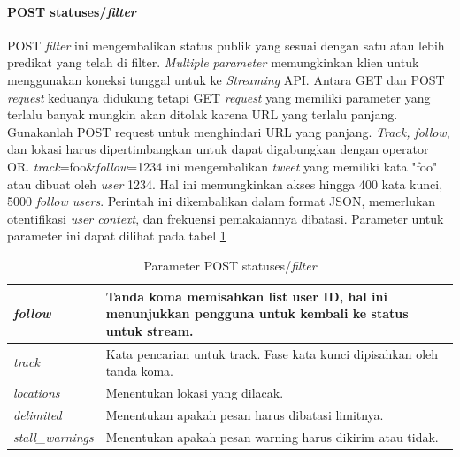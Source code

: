 \paragraph{POST statuses/\textit{filter}}
POST \textit{filter} ini mengembalikan status publik yang sesuai dengan satu atau lebih predikat yang telah di filter. \textit{Multiple parameter} memungkinkan klien untuk menggunakan koneksi tunggal untuk ke \textit{Streaming} API. Antara GET dan POST \textit{request} keduanya didukung tetapi GET \textit{request} yang memiliki parameter yang terlalu banyak mungkin akan ditolak karena URL yang terlalu panjang. Gunakanlah POST request untuk menghindari URL yang panjang.
\textit{Track, follow}, dan lokasi harus dipertimbangkan untuk dapat digabungkan dengan operator OR. \textit{track}=foo\&\textit{follow}=1234 ini mengembalikan \textit{tweet} yang memiliki kata "foo" atau dibuat oleh \textit{user} 1234.
Hal ini memungkinkan akses hingga 400 kata kunci, 5000 \textit{follow users}. Perintah ini dikembalikan dalam format JSON, memerlukan otentifikasi \textit{user context}, dan frekuensi pemakaiannya dibatasi. Parameter untuk parameter ini dapat dilihat pada tabel \ref{table:ParameterPostStatusesFilter}



\begin{table}[h]
\begin{tabular}{|p{3cm}|p{11cm}|}
\hline
\textit{follow}          & Tanda koma memisahkan list user ID, hal ini menunjukkan pengguna untuk kembali ke status untuk stream. \\ \hline
\textit{track}           & Kata pencarian untuk track. Fase kata kunci dipisahkan oleh tanda koma.                \\ \hline
\textit{locations}       & Menentukan lokasi yang dilacak.                                                    \\ \hline
\textit{delimited}       & Menentukan apakah pesan harus dibatasi limitnya.                                         \\ \hline
\textit{stall\_warnings} & Menentukan apakah pesan warning harus dikirim atau tidak. \\ \hline                                        
\end{tabular}
\caption{Parameter POST statuses/\textit{filter}}
\label{table:ParameterPostStatusesFilter}
\end{table}


